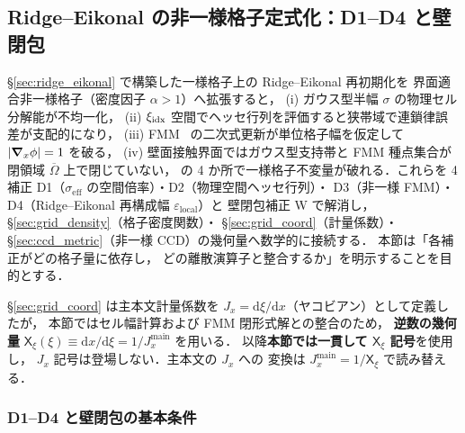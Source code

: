 %
%
\subsection{Ridge--Eikonal の非一様格子定式化：D1--D4 と壁閉包}
\label{sec:ridge_eikonal_nu_grid}

\S\ref{sec:ridge_eikonal} で構築した一様格子上の Ridge--Eikonal 再初期化を
界面適合非一様格子（密度因子 $\alpha>1$）へ拡張すると，
(i) ガウス型半幅 $\sigma$ の物理セル分解能が不均一化，
(ii) $\xi_{\text{idx}}$ 空間でヘッセ行列を評価すると狭帯域で連鎖律誤差が支配的になり，
(iii) FMM~\cite{Sethian1996} の二次式更新が単位格子幅を仮定して $|\bm{\nabla}_x\phi|=1$ を破る，
(iv) 壁面接触界面ではガウス型支持帯と FMM 種点集合が
閉領域 $\overline{\Omega}$ 上で閉じていない，
の 4 か所で一様格子不変量が破れる．これらを 4 補正
D1（$\sigma_\text{eff}$ の空間倍率）・D2（物理空間ヘッセ行列）・
D3（非一様 FMM）・D4（Ridge--Eikonal 再構成幅 $\varepsilon_\text{local}$）と
壁閉包補正 W で解消し，
\S\ref{sec:grid_density}（格子密度関数）・
\S\ref{sec:grid_coord}（計量係数）・
\S\ref{sec:ccd_metric}（非一様 CCD）の幾何量へ数学的に接続する．
本節は「各補正がどの格子量に依存し，
どの離散演算子と整合するか」を明示することを目的とする．

\begin{remark}[本節の記号規約]
\label{rem:ridge_nu_jx_convention}
\S\ref{sec:grid_coord} は主本文計量係数を
$J_x = \mathrm{d}\xi/\mathrm{d}x$（ヤコビアン）として定義したが，
本節ではセル幅計算および FMM 閉形式解との整合のため，
\textbf{逆数の幾何量}
$\mathsf{X}_\xi(\xi) \equiv \mathrm{d}x/\mathrm{d}\xi = 1/J_x^{\mathrm{main}}$ を用いる．
以降\textbf{本節では一貫して $\mathsf{X}_\xi$ 記号}を使用し，
$J_x$ 記号は登場しない．主本文の $J_x$ への
変換は $J_x^{\mathrm{main}} = 1/\mathsf{X}_\xi$ で読み替える．
\end{remark}

\subsubsection{D1--D4 と壁閉包の基本条件}
\label{sec:ridge_nu_d1d4_math}

